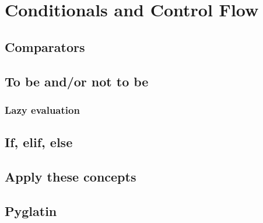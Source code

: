  

\chapter{Conditionals and Control Flow}

	\section{Comparators}
	
	
	\section{To be and/or not to be}
	
	
		\subsection{Lazy evaluation}
		
	
	\section{If, elif, else}
		
	\section{Apply these concepts}
	
		\section{Pyglatin}
		

